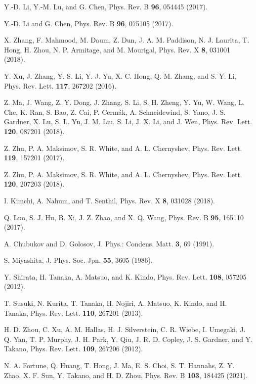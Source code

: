 \documentclass[aps,twocolumn,superscriptaddress,showpacs]{revtex4-1}
\begin{document}
\begin{thebibliography}{}
Y.-D. Li, Y.-M. Lu, and G. Chen, Phys. Rev. B {\bf 96}, 054445 (2017).

Y.-D. Li and G. Chen, Phys. Rev. B {\bf 96}, 075105 (2017).

X. Zhang, F. Mahmood, M. Daum, Z. Dun, J. A. M. Paddison, N. J. Laurita, T. Hong, H. Zhou, N. P. Armitage, and M. Mourigal, Phys. Rev. X {\bf 8}, 031001 (2018).

Y. Xu, J. Zhang, Y. S. Li, Y. J. Yu, X. C. Hong, Q. M. Zhang, and S. Y. Li, Phys. Rev. Lett. {\bf 117}, 267202 (2016).

Z. Ma, J. Wang, Z. Y. Dong, J. Zhang, S. Li, S. H. Zheng, Y. Yu, W. Wang, L. Che, K. Ran, S. Bao, Z. Cai, P. Cerm\'ak, A. Schneidewind, S. Yano, J. S. Gardner, X. Lu, S. L. Yu, J. M. Liu, S. Li, J. X. Li, and J. Wen, Phys. Rev. Lett. {\bf 120}, 087201 (2018).

Z. Zhu, P. A. Maksimov, S. R. White, and A. L. Chernyshev, Phys. Rev. Lett. {\bf 119}, 157201 (2017).

Z. Zhu, P. A. Maksimov, S. R. White, and A. L. Chernyshev, Phys. Rev. Lett. {\bf 120}, 207203 (2018).

I. Kimchi, A. Nahum, and T. Senthil, Phys. Rev. X {\bf 8}, 031028 (2018).

Q. Luo, S. J. Hu, B. Xi, J. Z. Zhao, and X. Q. Wang, Phys. Rev. B {\bf 95}, 165110 (2017).

A. Chubukov and D. Golosov, J. Phys.: Condens. Matt. {\bf 3}, 69 (1991).

S. Miyashita, J. Phys. Soc. Jpn. {\bf 55}, 3605 (1986).

Y. Shirata, H. Tanaka, A. Matsuo, and K. Kindo, Phys. Rev. Lett. {\bf 108}, 057205 (2012).

T. Susuki, N. Kurita, T. Tanaka, H. Nojiri, A. Matsuo, K. Kindo, and H. Tanaka, Phys. Rev. Lett. {\bf 110}, 267201 (2013).

H. D. Zhou, C. Xu, A. M. Hallas, H. J. Silverstein, C. R. Wiebe, I. Umegaki, J. Q. Yan, T. P. Murphy, J. H. Park, Y. Qiu, J. R. D. Copley, J. S. Gardner, and Y. Takano, Phys. Rev. Lett. {\bf 109}, 267206 (2012).

N. A. Fortune, Q. Huang, T. Hong, J. Ma, E. S. Choi, S. T. Hannahs, Z. Y. Zhao, X. F. Sun, Y. Takano, and H. D. Zhou, Phys. Rev. B {\bf 103}, 184425 (2021).


\end{thebibliography}
\end{document}
